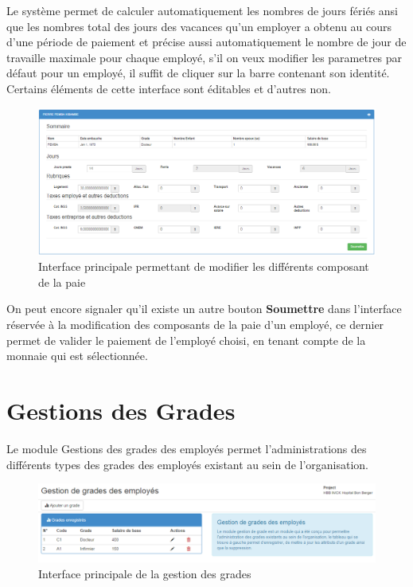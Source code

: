 \documentclass[12pt,a4paper]{report}
\begin{document}
Le système permet de calculer automatiquement les nombres de jours fériés ansi que les nombres total des jours des vacances qu'un employer a obtenu au cours d'une période de paiement et précise aussi automatiquement le nombre de jour de travaille maximale pour chaque employé, s'il on veux modifier les parametres par défaut pour un employé, il suffit de cliquer sur la barre contenant son identité. Certains éléments de cette interface sont éditables et d'autres non.


\begin{figure}[h]
\begin{center}
\includegraphics[width=14cm]{pic/payrollEmp.png}
\end{center}
\caption{Interface principale permettant de modifier les différents composant de la paie}
\label{Interface principale permettant de modifier les différents composant de la paie}
\end{figure}

On peut encore signaler qu'il existe un autre bouton \textbf{Soumettre} dans l'interface réservée à la modification des composants de la paie d'un employé, ce dernier permet de valider le paiement de l'employé choisi, en tenant compte de la monnaie qui est sélectionnée. 

\newpage
\section{Gestions des Grades}
Le module Gestions des grades des employés permet l'administrations des différents types des grades des employés existant au sein de l'organisation.
\begin{figure}[h]
\begin{center}
\includegraphics[width=14cm]{pic/gradeEmp.png}
\end{center}
\caption{Interface principale de la gestion des grades}
\label{Interface principale de la gestion des grades}
\end{figure}
\end{document}
